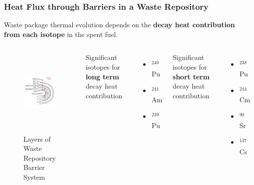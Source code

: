 \begin{frame}
    \frametitle{Heat Flux through Barriers in a Waste Repository}
    
    Waste package thermal evolution depends on the \textbf{decay heat contribution from each isotope} in the spent fuel. 
    \\
    \begin{columns}
      \column[t]{5cm}
    \begin{figure}[htbp!]
      \begin{center}
        \includegraphics[height=4.3cm]{../figures/barriers_annotated}
      \end{center}
            \caption{Layers of Waste Repository Barrier System }
    \end{figure}
    \column[t]{5cm}
    Significant isotopes for \textbf{long term} decay heat contribution \cite{wigeland_separations_2006}
    \begin{itemize}
      \item $^{240}$Pu
      \item $^{241}$Am
      \item $^{239}$Pu
    \end{itemize}
    Significant isotopes for \textbf{short term} decay heat contribution \cite{wigeland_separations_2006}
    \begin{itemize}
      \item $^{238}$Pu
      \item $^{244}$Cm
      \item $^{90}$Sr
      \item $^{137}$Cs
    \end{itemize}
    \end{columns}
  \end{frame}

